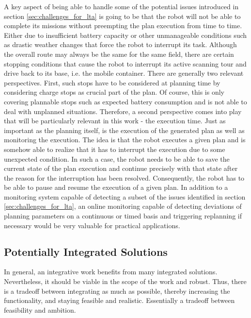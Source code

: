 \documentclass[english, master, expose, utf8]{base/thesis_KBS}
\begin{document}
A key aspect of being able to handle some of the potential issues introduced in section \ref{sec:challenges_for_lta} is going to be that the robot will not be able to
complete its missions without preempting the plan execution from time to time. Either due to insufficient battery capacity or other unmanageable conditions such as 
drastic weather changes that force the robot to interrupt its task. Although the overall route may always be the same for the same field, there are certain stopping
conditions that cause the robot to interrupt its active scanning tour and drive back to its base, i.e. the mobile container.
There are generally two relevant perspectives. First, such stops have to be considered at planning time by considering charge stops as crucial part of the plan.
Of course, this is only covering plannable stops such as expected battery consumption and is not able to deal with unplanned situations.
Therefore, a second perspective comes into play that will be particularly relevant in this work - the execution time.
Just as important as the planning itself, is the execution of the generated plan as well as monitoring the execution.
The idea is that the robot executes a given plan and is somehow able to realize that it has to interrupt the execution due to some unexpected condition.
In such a case, the robot needs to be able to save the current state of the plan execution and continue precisely with that state after the reason 
for the interruption has been resolved. Consequently, the robot has to be able to pause and resume the execution of a given plan.\newline
In addition to a monitoring system capable of detecting a subset of the issues identified in section \ref{sec:challenges_for_lta},
an online monitoring capable of detecting deviations of planning parameters on a continuous or timed basis and triggering replanning if necessary would
be very valuable for practical applications.

\subsection{Potentially Integrated Solutions}

In general, an integrative work benefits from many integrated solutions. Nevertheless, it should be viable in the scope of the work and robust.
Thus, there is a tradeoff between integrating as much as possible, thereby increasing the functionality, and staying feasible and realistic.
Essentially a tradeoff between feasibility and ambition.
\end{document}
